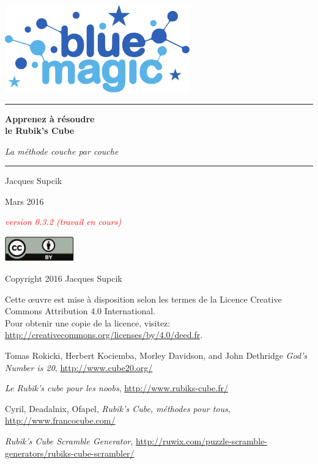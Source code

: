 \documentclass[10pt,paper=a5,pagesize]{scrbook}
\begin{document}
\frontmatter
\thispagestyle{empty}
\begin{titlepage}
\begin{center}
\includegraphics[width=8cm]{bluemagic_logo.pdf}
\vspace*{8mm}

\rule{\textwidth}{1pt}
{\Huge\textbf{Apprenez à résoudre\\
\medskip
le Rubik's Cube}}
\bigskip

{\LARGE\textit{La méthode \og couche par couche\fg}}
\rule{\textwidth}{1pt}
\vspace*{10mm}

{\Large Jacques Supcik}
\vspace*{10mm}

\enlargethispage{15mm}
{\Large Mars 2016}
\vfill

{\huge\textit{\textcolor{red}{version 0.3.2 (travail en cours)}}}

\end{center}
\end{titlepage}

\thispagestyle{empty}
\par\vspace*{\fill}
\includegraphics[width=30mm]{by.pdf}

Copyright \textcopyright{} 2016 Jacques Supcik

Cette œuvre est mise à disposition selon les termes de la Licence Creative Commons Attribution 4.0 International.
\medskip\\
Pour obtenir une copie de la licence, visitez:\\
\url{http://creativecommons.org/licenses/by/4.0/deed.fr}.
\newpage

\tableofcontents

\mainmatter







\backmatter
\begin{thebibliography}{9}
	
	 Tomas Rokicki, Herbert Kociemba, Morley Davidson, and John Dethridge
	\emph{God's Number is 20},
	\url{http://www.cube20.org/}

	\emph{Le Rubik's cube pour les noobs},
	\url{http://www.rubiks-cube.fr/}

	Cyril, Deadalnix, Ofapel,
	\emph{Rubik's Cube, méthodes pour tous},
	\url{http://www.francocube.com/}
	
	\emph{Rubik’s Cube Scramble Generator},
	\url{http://ruwix.com/puzzle-scramble-generators/rubiks-cube-scrambler/}
	
	
\end{thebibliography}
\end{document}
